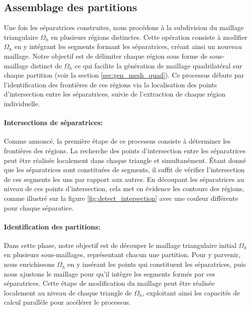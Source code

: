 \subsection{Assemblage des partitions}

Une fois les séparatrices construites, nous procédons à la subdivision du maillage triangulaire $\Omega_h$ en plusieurs régions distinctes. Cette opération consiste à modifier $\Omega_h$ en y intégrant les segments formant les séparatrices, créant ainsi un nouveau maillage. Notre objectif est de délimiter chaque région sous forme de sous-maillage distinct de $\Omega_h$ ce qui facilite la génération de maillage quadrilatéral sur chaque partition (voir la section \ref{sec:gen_mesh_quad}). Ce processus débute par l'identification des frontières de ces régions via la localisation des points d'intersection entre les séparatrices, suivie de l'extraction de chaque région individuelle.

\paragraph{Intersections de séparatrices:}

Comme annoncé, la première étape de ce processus consiste à déterminer les frontières des régions. La recherche des points d'intersection entre les séparatrices peut être réalisée localement dans chaque triangle et simultanément. Étant donné que les séparatrices sont constituées de segments, il suffit de vérifier l'intersection de ces segments les uns par rapport aux autres. En découpant les séparatrices au niveau de ces points d'intersection, cela met en évidence les contours des régions, comme illustré sur la figure \ref{fig:detect_intersection} avec une couleur différente pour chaque séparatice.

\paragraph{Identification des partitions:}
Dans cette phase, notre objectif est de découper le maillage triangulaire initial $\Omega_h$ en plusieurs sous-maillages, représentant chacun une partition. Pour y parvenir, nous enrichissons $\Omega_h$ en y insérant les points qui constituent les séparatrices, puis nous ajustons le maillage pour qu'il intègre les segments formés par ces séparatrices. Cette étape de modification du maillage peut être réalisée localement au niveau de chaque triangle de $\Omega_h$, exploitant ainsi les capacités de calcul parallèle pour accélérer le processus.

